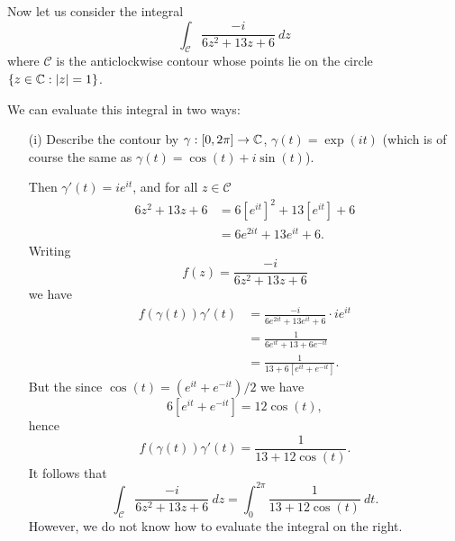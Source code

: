 \begin{example}
\label{e:trig1}
Now let us consider the integral
\[
\int_{\mathcal{C}} \frac{-i}{6z^2+13z+6}\ dz
\]
where $\mathcal{C}$ is the anticlockwise contour whose points lie on the circle $\left\{z \in \mathbb{C}: \left| z \right|=1 \right\}$. 
\end{example}
 We can evaluate this integral in two ways:
\begin{enumerate}
\item[(i)] Describe the contour by $\gamma:[0,2\pi] \to \mathbb{C}$, $\gamma(t) = \exp(it)$ (which is of course the same as $\gamma(t)=\cos (t) + i \sin (t)$).

Then $\gamma'(t)=ie^{it}$, and for all $z \in \mathcal{C}$
\begin{align*}
6z^2+13z+6 & = 6 \left[ e^{it} \right]^2 + 13 \left[ e^{it} \right] + 6 \\
& = 6 e^{2it} + 13 e^{it} + 6.
\end{align*}
Writing
\[
f(z) =  \frac{-i}{6z^2+13z+6}
\]
we have
\begin{align*}
f \left( \gamma(t) \right) \gamma ' (t) & = \frac{-i}{6e^{2it}+13e^{it}+6} \cdot ie^{it} \\
& = \frac{1}{6e^{it}+13+6e^{-it}} \\
& = \frac{1}{13+6[e^{it}+e^{-it}]}.
\end{align*}
But the since $\cos(t) = (e^{it}+e^{-it})/2$ we have
\[
6[e^{it}+e^{-it}] = 12 \cos (t),
\]
hence
\[
f \left( \gamma(t) \right) \gamma ' (t) = \frac{1}{13+12\cos (t)}.
\]
It follows that
\[
\int_{\mathcal{C}} \frac{-i}{6z^2+13z+6}\ dz=  \int_0^{2\pi} \frac{1}{13+12 \cos (t)}\ dt.
\]
However, we do not know how to evaluate the integral on the right.





\end{enumerate}
